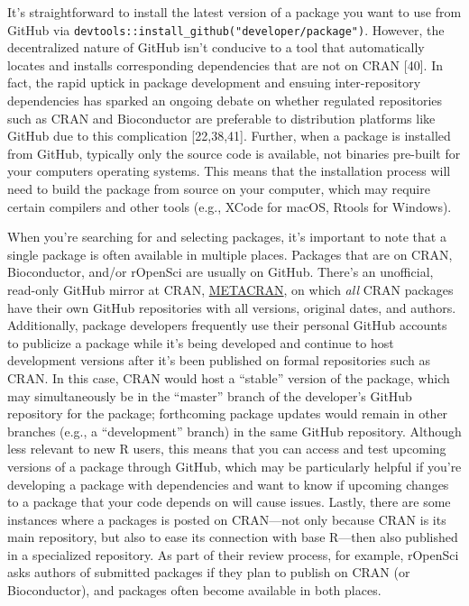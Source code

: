 \documentclass[10pt,letterpaper]{article}
\begin{document}
It's straightforward to install the latest version of a package you want
to use from GitHub via
\texttt{devtools::install\_github("developer/package")}. However, the
decentralized nature of GitHub isn't conducive to a tool that
automatically locates and installs corresponding dependencies that are
not on CRAN {[}40{]}. In fact, the rapid uptick in package development
and ensuing inter-repository dependencies has sparked an ongoing debate
on whether regulated repositories such as CRAN and Bioconductor are
preferable to distribution platforms like GitHub due to this
complication {[}22,38,41{]}. Further, when a package is installed from
GitHub, typically only the source code is available, not binaries
pre-built for your computers operating systems. This means that the
installation process will need to build the package from source on your
computer, which may require certain compilers and other tools (e.g.,
XCode for macOS, Rtools for Windows).

When you're searching for and selecting packages, it's important to note
that a single package is often available in multiple places. Packages
that are on CRAN, Bioconductor, and/or rOpenSci are usually on GitHub.
There's an unofficial, read-only GitHub mirror at CRAN,
\href{https://github.com/cran}{METACRAN}, on which \emph{all} CRAN
packages have their own GitHub repositories with all versions, original
dates, and authors. Additionally, package developers frequently use
their personal GitHub accounts to publicize a package while it's being
developed and continue to host development versions after it's been
published on formal repositories such as CRAN. In this case, CRAN would
host a ``stable'' version of the package, which may simultaneously be in
the ``master'' branch of the developer's GitHub repository for the
package; forthcoming package updates would remain in other branches
(e.g., a ``development'' branch) in the same GitHub repository. Although
less relevant to new R users, this means that you can access and test
upcoming versions of a package through GitHub, which may be particularly
helpful if you're developing a package with dependencies and want to
know if upcoming changes to a package that your code depends on will
cause issues. Lastly, there are some instances where a packages is
posted on CRAN---not only because CRAN is its main repository, but also
to ease its connection with base R---then also published in a
specialized repository. As part of their review process, for example,
rOpenSci asks authors of submitted packages if they plan to publish on
CRAN (or Bioconductor), and packages often become available in both
places.
\end{document}
